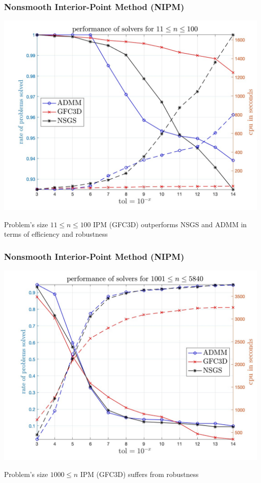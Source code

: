 \begin{frame}
  \frametitle{Nonsmooth Interior-Point Method (NIPM)}
   \begin{center}
    \includegraphics[height=0.7\textheight]{./figure/IPM/solver_performance_11_100.jpg}
  \end{center}
  \begin{block}{Problem's size $11\leq n \leq 100$}
    IPM (GFC3D) outperforms NSGS and ADMM in terms of efficiency and robustness
  \end{block}
\end{frame}
\begin{frame}
  \frametitle{Nonsmooth Interior-Point Method (NIPM)}
  
  \begin{center}
    \includegraphics[height=0.7\textheight]{./figure/IPM/solver_performance_1000_.jpg}
  \end{center}

  \begin{block}{Problem's size $1000\leq n $}
    IPM (GFC3D) suffers from robustness
  \end{block}
  
\end{frame}

